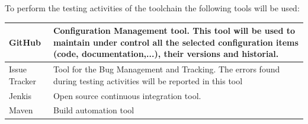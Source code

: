 To perform the testing activities of the toolchain the following tools will be used:

\begin{center}
\begin{longtable}{|p{2cm}|p{8cm}|}\hline
GitHub & Configuration Management tool. This tool will be used to maintain under control all the selected configuration items (code, documentation,...), their versions and historial.\\\hline
Issue Tracker & Tool for the Bug Management and Tracking. The errors found during testing activities will be reported in this tool\\\hline
Jenkis & Open source continuous integration tool.\\\hline
Maven &  Build automation tool\\\hline
\end{longtable}
\end{center}


